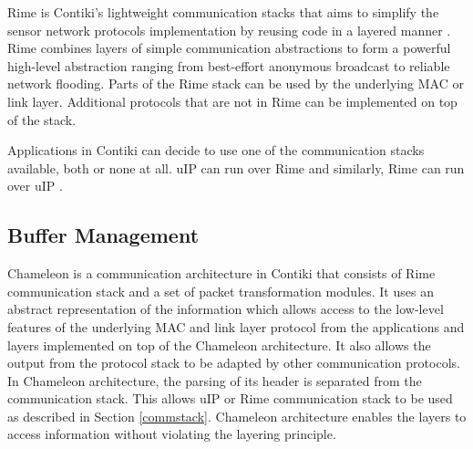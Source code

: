 Rime is Contiki's lightweight communication stacks that aims to simplify the sensor network protocols implementation by reusing code in a layered manner \cite{rimeposter}. Rime combines layers of simple communication abstractions to form a powerful high-level abstraction ranging from best-effort anonymous broadcast to reliable network flooding. Parts of the Rime stack can be used by the underlying MAC or link layer. Additional protocols that are not in Rime can be implemented on top of the stack.

Applications in Contiki can decide to use one of the communication stacks available, both or none at all. uIP can run over Rime and similarly, Rime can run over uIP \cite{contikitutorial}. 





\subsection{Buffer Management}
\label{bufmgmt}
Chameleon \cite{rime} is a communication architecture in Contiki that consists of Rime communication stack and a set of packet transformation modules. It uses an abstract representation of the information which allows access to the low-level features of the underlying MAC and link layer protocol from the applications and layers implemented on top of the Chameleon architecture. It also allows the output from the protocol stack to be adapted by other communication protocols. In Chameleon architecture, the parsing of its header is separated from the communication stack. This allows uIP or Rime communication stack to be used as described in Section \ref{commstack}. Chameleon architecture enables the layers to access information without violating the layering principle. 

